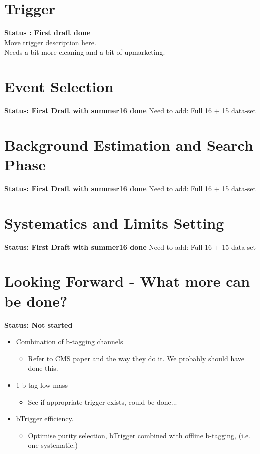 \section{Trigger}

\textbf{Status : First draft done}\\
\noindent
Move trigger description here.\\
Needs a bit more cleaning and a bit of upmarketing.\\

\section{Event Selection}

\textbf{Status: First Draft with summer16 done}
Need to add:
Full 16 + 15 data-set

\section{Background Estimation and Search Phase}

\textbf{Status: First Draft with summer16 done}
Need to add:
Full 16 + 15 data-set

\section{Systematics and Limits Setting}


\textbf{Status: First Draft with summer16 done}
Need to add:
Full 16 + 15 data-set

\section{Looking Forward - What more can be done?}

\textbf{Status: Not started}

\begin{itemize}
  \item{Combination of b-tagging channels}
    \begin{itemize}[label={$-$}]
    \item{Refer to CMS paper and the way they do it. We probably should have done this.}
    \end{itemize}
  \item{1 b-tag low mass}
    \begin{itemize}[label={$-$}]
    \item{See if appropriate trigger exists, could be done...}
    \end{itemize}
  \item{bTrigger efficiency.}
    \begin{itemize}[label={$-$}]
    \item{Optimise purity selection, bTrigger combined with offline b-tagging, (i.e. one systematic.) }
    \end{itemize}
  \end{itemize}
  
